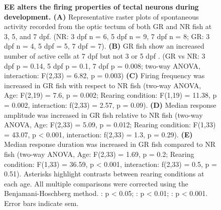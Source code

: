 \begin{figure}[]
            \caption[\label{fig:R2_F3} \textbf{EE alters the spontaneous properties of single neurons during development.}]{\label{fig:R2_F3} \textbf{EE alters the firing properties of tectal neurons during development. (A)} Representative raster plots of spontaneous activity recorded from the optic tectum of both GR and NR fish at 3, 5, and 7 \gls{dpf}. (NR: 3 \gls{dpf} n = 6, 5 \gls{dpf} n = 9, 7 \gls{dpf} n = 8; GR: 3 \gls{dpf} n = 4, 5 \gls{dpf} = 5, 7 \gls{dpf} = 7). \textbf{(B)} GR fish show an increased number of active cells at 7 \gls{dpf} but not 3 or 5 \gls{dpf} . (GR vs NR: 3 \gls{dpf} p = 0.14, 5 \gls{dpf} p = 0.1, 7 \gls{dpf} p = 0.008; two-way ANOVA, interaction: F(2,33) = 6.82, p =  0.003) \textbf{(C)} Firing frequency was increased in GR fish with respect to NR fish (two-way ANOVA, Age: F(2,19) = 7.6, p = 0.002; Rearing condition: F(1,19) = 11.38, p = 0.002, interaction: f(2,33) =  2.57, p = 0.09). \textbf{(D)} Median response amplitude was increased in GR fish relative to NR fish (two-way ANOVA, Age: F(2,33) = 5.09, p = 0.012; Rearing condition: F(1,33) = 43.07, p < 0.001, interaction: f(2,33) =  1.3, p = 0.29). \textbf{(E)} Median response duration was increased in GR fish compared to NR fish (two-way ANOVA, Age: F(2,33) = 1.69, p = 0.2; Rearing condition: F(1,33) = 36.59, p < 0.001, interaction: f(2,33) =  0.5, p = 0.51). Asterisks highlight contrasts between rearing conditions at each age. All multiple comparisons were corrected using the Benjamani-Hoschberg method. \text{*} : p < 0.05; \text{**} : p < 0.01; \text{***}: p < 0.001. Error bars indicate \gls{sem}.
            }
      \end{figure}



